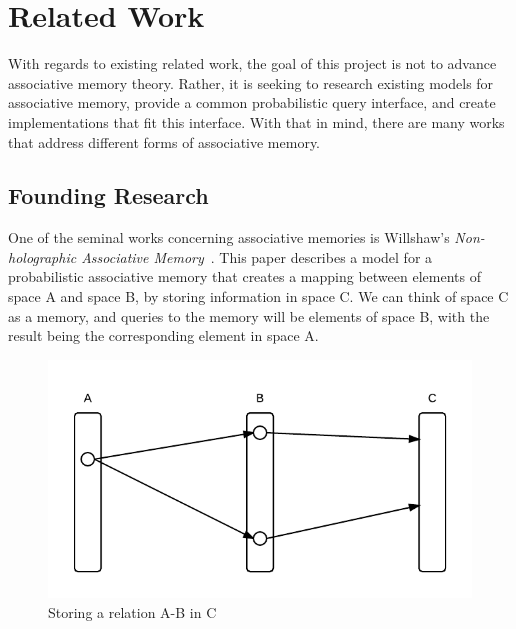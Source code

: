 \documentclass{sig-alternate}
\begin{document}

\section{Related Work}
\label{sec:related_work}

With regards to existing related work, the goal of this project is not to advance associative memory theory. Rather, it is seeking to research existing
models for associative memory, provide a common probabilistic query interface, and create 
implementations that fit this interface. With that in mind, there are many works that 
address different forms of associative memory. 

\subsection{Founding Research}
\label{subsec:founding}

One of the seminal works concerning associative memories is Willshaw's \textit{Non-holographic
Associative Memory}~\cite{holographic}. This paper describes a model for a probabilistic associative memory
that creates a mapping between elements of space A and space B, by storing information
in space C. We can think of space C as a memory, and queries to the memory will be elements
of space B, with the result being the corresponding element in space A.

\begin{figure}[H]
	\begin{center}
		\includegraphics[width=1\linewidth]{mapping}
	\end{center}
	\vspace{-12pt}
	\caption{Storing a relation A-B in C}
	\label{fig:mapping}
\end{figure}
\end{document}
